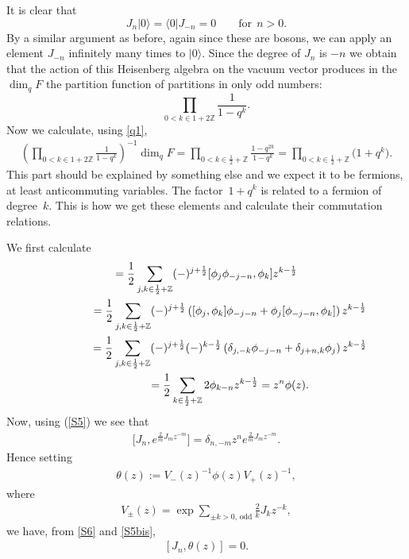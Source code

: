 \documentclass[pdftex]{sigma}
\numberwithin{equation}{section}
\newcommand{\INZ}[2]{\in\frac#1#2 +\mathbb{Z}}
\begin{document}
It is clear that
\[
J_n|0\rangle=\langle 0|J_{-n}=0\qquad\mbox{for}\ \ n>0 .
\]
By a similar argument as before,
again since these are bosons, we can apply an element $J_{-n}$
inf\/initely many times to $|0\rangle$. Since the degree of $J_n$ is $-n$
 we obtain that the action of this Heisenberg algebra on the vacuum
vector produces in the $\dim_q F$ the partition function of partitions in only odd numbers:
\[
\prod_{0< k\in 1+2\mathbb{Z}}\frac{1}{1-q^k}.
\]
Now we calculate, using \eqref{q1},
\begin{gather}
\left(\prod_{0< k\in
1+2\mathbb{Z}}\frac{1}{1-q^k}\right)^{-1}\dim_q F=
\prod_{0< k\in\frac{1}{2}+\mathbb{Z}}\frac{{1-q^{2k}}}{1-q^k}
=\prod_{0< k\in\frac{1}{2}+\mathbb{Z}}\big(1+q^k\big).\label{q3}
\end{gather}
 This part should be explained by something else and we expect it to be
fermions, at least anticommuting variables. The factor~$1+q^k$
is related to a fermion of degree~$k$. This is how we
get these elements and calculate their commutation relations.

We f\/irst calculate
\begin{gather}
  [J_n, \phi(z)] =\frac 12\sum_{j,k\INZ12}(-)^{j+\frac 12}
[\phi_j\phi_{-j-n}, \phi_k]z^{k-\frac 12}\nonumber\\
\hphantom{[J_n, \phi(z)]}{} =\frac{1}{2}\sum_{j,k\INZ12}(-)^{j+\frac 12} \left(
[\phi_j, \phi_k]\phi_{-j-n}+ \phi_j[\phi_{-j-n}, \phi_k]
\right) z^{k-\frac12}\nonumber\\
\hphantom{[J_n, \phi(z)]}{}
=\frac 12\sum_{j,k\INZ12}(-)^{j+\frac 12}
(-)^{k-\frac 12}\left(\delta_{j,-k}\phi_{-j-n}+\delta_{j+n,k}\phi_j\right)
z^{k-\frac 12}\nonumber\\
\hphantom{[J_n, \phi(z)]}{}
=\frac12\sum_{k\INZ12} 2\phi_{k-n}z^{k-\frac 12}
=z^n\phi(z) .\label{S6}
\end{gather}
Now, using (\ref{S5}) we see that
\begin{gather}\label{S5bis}
\big[J_n,e^{\frac2m J_mz^{-m}}\big]=\delta_{n,-m}z^n e^{\frac2m J_mz^{-m}}.
\end{gather}
Hence setting
\begin{gather}\label{theta}
 \theta(z):=V_-(z)^{-1}\phi(z)V_+(z)^{-1},
\end{gather}
where
\begin{gather}
\label{exp}
V_\pm(z)
=\exp\sum_{\pm k>0,\,\mathrm{odd}}\frac{2}{k}J_k z^{-k} ,
\end{gather}
we have, from
\eqref{S6} and \eqref{S5bis},
\begin{gather}\label{comm-Htheta}
[J_n, \theta(z)]=0 .
\end{gather}
\end{document}
